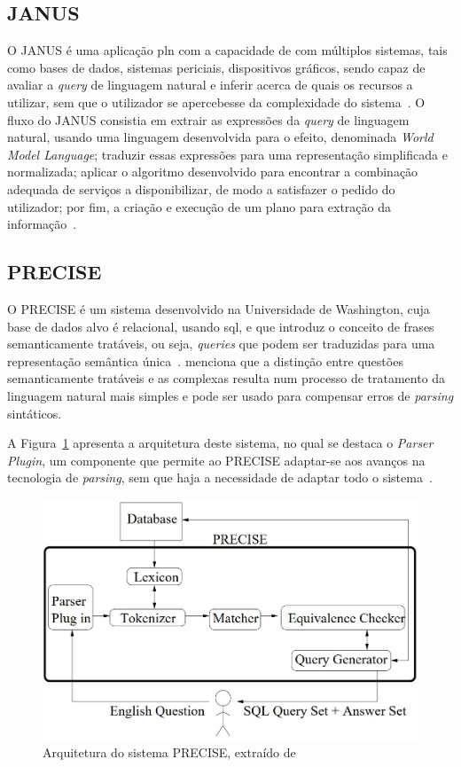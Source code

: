 \subsection{JANUS}
O JANUS é uma aplicação \gls{pln} com a capacidade de  com múltiplos sistemas, tais como bases de dados, sistemas periciais, dispositivos gráficos, sendo capaz de avaliar a \textit{query} de linguagem natural e inferir acerca de quais os recursos a utilizar, sem que o utilizador se apercebesse da complexidade do sistema~\parencite{nlidb_brief_review, access_multiple_underlying_system_janus}. O fluxo do JANUS consistia em extrair as expressões da \textit{query} de linguagem natural, usando uma linguagem desenvolvida para o efeito, denominada \textit{World Model Language}; traduzir essas expressões para uma representação simplificada e normalizada; aplicar o algoritmo desenvolvido para encontrar a combinação adequada de serviços a disponibilizar, de modo a satisfazer o pedido do utilizador; por fim, a criação e execução de um plano para extração da informação~\parencite{access_multiple_underlying_system_janus}.

\subsection{PRECISE}
O PRECISE é um sistema desenvolvido na Universidade de Washington, cuja base de dados alvo é relacional, usando \gls{sql}, e que introduz o conceito de frases semanticamente tratáveis, ou seja, \textit{queries} que podem ser traduzidas para uma representação semântica única~\parencite{overview_nlidb_approaches_implementation_airline, nlidb_brief_review}. \textcite{modern_nlidb_composing_statistical_parsing_semantic_tractability} menciona que a distinção entre questões semanticamente tratáveis e as complexas resulta num processo de tratamento da linguagem natural mais simples e pode ser usado para compensar erros de \textit{parsing} sintáticos. 

A Figura~\ref{fig:precise_architecture} apresenta a arquitetura deste sistema, no qual se destaca o \textit{Parser Plugin}, um componente que permite ao PRECISE adaptar-se aos avanços na tecnologia de \textit{parsing}, sem que haja a necessidade de adaptar todo o sistema~\parencite{modern_nlidb_composing_statistical_parsing_semantic_tractability}. 

\begin{figure}[!ht]
    \centering
    \includegraphics[width=.65\textwidth]{ch03/assets/precise_architecture.jpg}
    \caption{Arquitetura do sistema PRECISE, extraído de~\textcite{towards_theory_nli_databases}}
    \label{fig:precise_architecture}
\end{figure}

